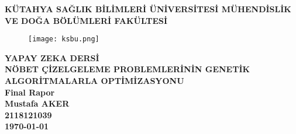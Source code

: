 \documentclass[12pt, a4paper]{article}
\begin{document}
	
	\textbf{KÜTAHYA SAĞLIK BİLİMLERİ ÜNİVERSİTESİ
		MÜHENDİSLİK VE DOĞA BÖLÜMLERİ FAKÜLTESİ}\centering \\[20pt]
	
	\begin{figure}[!h]
		\centering
		\texttt{[image: ksbu.png]}
		\\[20pt]
	\end{figure}
	
	\textbf{YAPAY ZEKA DERSİ}\centering\\[10pt]
	
	\textbf{NÖBET ÇİZELGELEME PROBLEMLERİNİN GENETİK ALGORİTMALARLA OPTİMİZASYONU}\centering\\[5pt]
	\textbf{Final Rapor}\\[5pt] 
	\textbf{Mustafa AKER} \\[5pt] 
	\textbf{2118121039} \\[5pt]
	\textbf{\today}\\[20pt]
\end{document}
